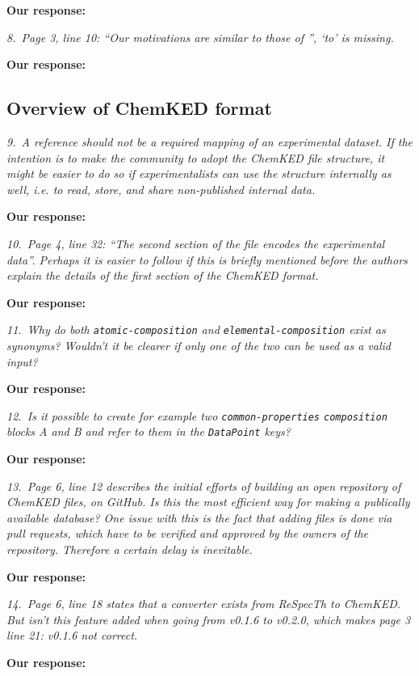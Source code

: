 \documentclass[a4paper,10pt]{elsarticle}
\begin{document}
\textbf{Our response:}


\textit{8.~Page 3, line 10: ``Our motivations are similar to those of '', `to' is missing.}

\textbf{Our response:}


\subsection*{Overview of ChemKED format}

\textit{9.~A reference should not be a required mapping of an experimental dataset. If the intention is to make the community to adopt the ChemKED file structure, it might be easier to do so if experimentalists can use the structure internally as well, i.e. to read, store, and share non-published internal data.}

\textbf{Our response:}

\textit{10.~Page 4, line 32: ``The second section of the file encodes the experimental data''. Perhaps it is easier to follow if this is briefly mentioned before the authors explain the details of the first section of the ChemKED format.}

\textbf{Our response:}

\textit{11.~Why do both \texttt{atomic-composition} and \texttt{elemental-composition} exist as synonyms? Wouldn't it be clearer if only one of the two can be used as a valid input?}

\textbf{Our response:}


\textit{12.~Is it possible to create for example two \texttt{common-properties} \texttt{composition} blocks A and B and refer to them in the \texttt{DataPoint} keys?}

\textbf{Our response:}


\textit{13.~Page 6, line 12 describes the initial efforts of building an open repository of ChemKED files, on GitHub. Is this the most efficient way for making a publically available database? One issue with this is the fact that adding files is done via pull requests, which have to be verified and approved by the owners of the repository. Therefore a certain delay is inevitable.}

\textbf{Our response:}

\textit{14.~Page 6, line 18 states that a converter exists from ReSpecTh to ChemKED. But isn't this feature added when going from v0.1.6 to v0.2.0, which makes page 3 line 21: v0.1.6 not correct.}

\textbf{Our response:}
\end{document}
